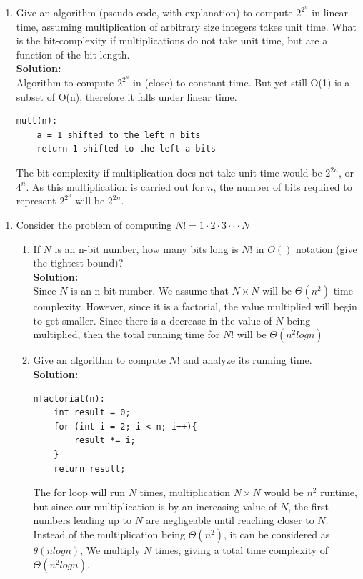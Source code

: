 \documentclass{article}
\begin{document}
    \begin{enumerate}[label=\textbf{Q1}]
        \item Give an algorithm (pseudo code, with explanation) to compute $2^{2^n}$ in linear time, assuming multiplication of arbitrary size integers takes unit time. What is the bit-complexity if multiplications do not take unit time, but are a function of the bit-length. \\
        \textbf{Solution:}\\
        Algorithm to compute $2^{2^n}$ in (close) to constant time. But yet still O(1) is a subset of O(n), therefore it falls under linear time.
        \begin{verbatim}
mult(n):
    a = 1 shifted to the left n bits
    return 1 shifted to the left a bits
        \end{verbatim}
        The bit complexity if multiplication does not take unit time would be
        $2^{2n}$, or $4^n$. As this multiplication is carried out for $n$, the
        number of bits required to represent $2^{2^n}$ will be $2^{2n}$.
    \end{enumerate}

    \begin{enumerate}[label=\textbf{Q2}]
        \item Consider the problem of computing $N! = 1 \cdot 2 \cdot 3 \cdot \cdot \cdot N$
        \begin{enumerate}[label=(\alph*)]
            \item If $N$ is an n-bit number, how many bits long is $N!$ in $O()$ notation (give the tightest bound)?\\
            \textbf{Solution:}\\
            Since $N$ is an n-bit number. We assume that $N \times N$ will be $\Theta(n^2)$ time
            complexity. However, since it is a factorial, the value multiplied will begin to get smaller.
            Since there is a decrease in the value of $N$ being multiplied, then the total running
            time for $N!$ will be $\Theta(n^2logn)$
            \item Give an algorithm to compute $N!$ and analyze its running time.\\
            \textbf{Solution:}
            \begin{verbatim}
nfactorial(n):
    int result = 0;
    for (int i = 2; i < n; i++){
        result *= i;
    }
    return result;
            \end{verbatim}
            The for loop will run $N$ times, multiplication $N \times N$ would be $n^2$ runtime,
            but since our multiplication is by an increasing value of $N$, the first numbers leading
            up to $N$ are negligeable until reaching closer to $N$. Instead of the multiplication being $\Theta(n^2)$, 
            it can be considered as $\theta(nlog n)$, We multiply $N$ times, giving
            a total time complexity of $\Theta(n^2logn)$.
        \end{enumerate}
    \end{enumerate}
\end{document}
